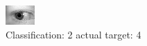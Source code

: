 \begin{figure}[h!]
\begin{center}
\includegraphics[width=0.60\columnwidth]{figures/ID791_class_2_target_4.png}
\end{center}
\caption{ Classification: 2 actual target: 4}
\label{fig:ID791_class_2_target_4}
\end{figure}
